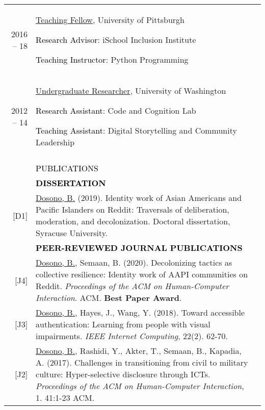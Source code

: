 \documentclass[11pt]{article}
\begin{document}
{{\begin{longtable}{Rp{0.75in}p{5.0in}}
\footnotesize{2016 -- 18} & \href{http://www.sis.pitt.edu/i3/phd-fellows/fellow-profiles.html}{{Teaching Fellow}}, University of Pittsburgh \par \textcolor{black}{Research Advisor}: iSchool Inclusion Institute \par \textcolor{black}{Teaching Instructor}: Python Programming\\

\footnotesize{2012 -- 14} & \href{https://faculty.washington.edu/ajko/lab}{{Undergraduate Researcher}}, University of Washington \par \textcolor{black}{Research Assistant}: Code and Cognition Lab \par \textcolor{black}{Teaching Assistant}: Digital Storytelling and Community Leadership\\
\\

\sout{\hfill} 
& \par \Large \textcolor{black}{\uppercase{Publications\hspace{6pt} \sout{\hfill}}}\\

& \textcolor{black}{\uppercase{\textbf{Dissertation}}}\\

\footnotesize{[D1]} & \href{https://surface.syr.edu/etd/1034/}{Dosono, B.} (2019). Identity work of Asian Americans and Pacific Islanders on Reddit: Traversals of deliberation, moderation, and decolonization. Doctoral dissertation, Syracuse University.\\

& \textcolor{black}{\uppercase{\textbf{Peer-reviewed Journal Publications}}}\\

\footnotesize{[J4]} & \href{https://dl.acm.org/doi/10.1145/3392881?cid=88158835957}{{Dosono, B.}}, Semaan, B. (2020). Decolonizing tactics as collective resilience: Identity work of AAPI communities on Reddit. \textit{Proceedings of the ACM on Human-Computer Interaction}. ACM. \textbf{Best Paper Award}.\\

\footnotesize{[J3]} & \href{https://doi.org/10.1109/MIC.2018.112101619}{{Dosono, B.}}, Hayes, J., Wang, Y. (2018). Toward accessible authentication: Learning from people with visual impairments. \textit{IEEE Internet Computing}, 22(2). 62-70.\\

\footnotesize{[J2]} & \href{https://dl.acm.org/authorize?N42807}{{Dosono, B.}}, Rashidi, Y., Akter, T., Semaan, B., Kapadia, A. (2017). Challenges in transitioning from civil to military culture: Hyper-selective disclosure through ICTs. \textit{Proceedings of the ACM on Human-Computer Interaction}, 1. 41:1-23 ACM.\\


\end{longtable}}}
\end{document}
